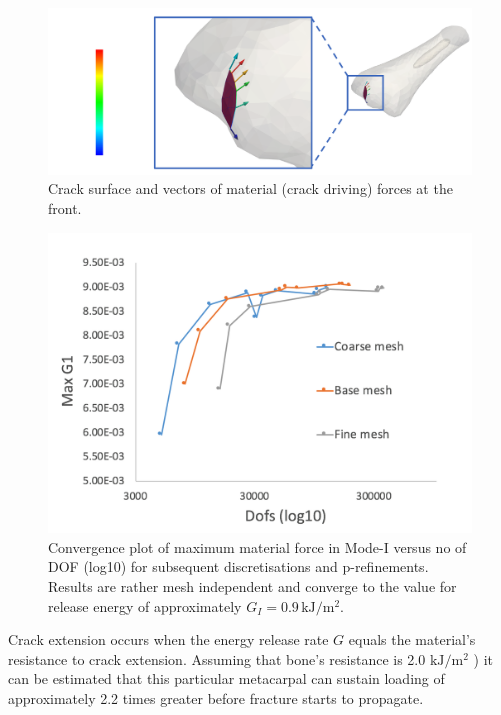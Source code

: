 \documentclass[11pt]{ACMEarticle}
\numberwithin{equation}{section}
\begin{document}
\begin{figure}
	\centering
	\includegraphics[width=0.9\linewidth]{Figures/crack_front_force}
	\caption{Crack surface and vectors of material (crack driving) forces at the front.}
	\label{fig:crackfrontforce}
\end{figure}

\begin{figure}
	\centering
	\includegraphics[width=0.7\linewidth]{Figures/graphs/max_g1_convergece}
	\caption{Convergence plot of maximum material force in Mode-I versus no of DOF (log10) for subsequent discretisations and p-refinements. Results are rather mesh independent and converge to the value for release energy of approximately $ G_I = 0.9 \, \mathrm{kJ} / \mathrm{m}^2$. }
	\label{fig:max_g1_convergece}
\end{figure}
Crack extension occurs when the energy release rate $G$ equals the material's resistance to crack extension. Assuming that bone's resistance is 2.0 $\mathrm{ kJ/m^2}$ ) \citep{gasser2007numerical} it can be estimated that this particular metacarpal can sustain loading of approximately 2.2 times greater before fracture starts to propagate. 
\end{document}
